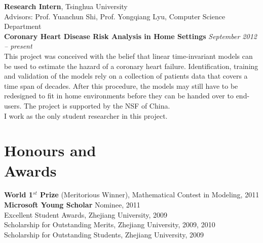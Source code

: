 \documentclass[margin,line]{resume}
\begin{document}
\begin{resume}
    \textbf{Research Intern}, Tsinghua University \\
    Advisors: Prof. Yuanchun Shi, Prof. Yongqiang Lyu, Computer Science Department \vspace{2mm}\\%
    \textbf{Coronary Heart Disease Risk Analysis in Home Settings} \hfill \textsl{September 2012 -- present}\\
    This project was conceived with the belief that linear time-invariant models can be used to estimate the hazard of a coronary heart failure. Identification, training and validation of the models rely on a collection of patients data that covers a time span of decades. After this procedure, the models may still have to be redesigned to fit in home environments before they can be handed over to end-users. The project is supported by the NSF of China. \\
    I work as the only student researcher in this project.\\
   
   \vspace{5cm}
   
    

    \section{\mysidestyle Honours and\\Awards} 

   \textbf{World 1$^{st}$ Prize} (Meritorious Winner), Mathematical Contest in Modeling, 2011 \\
   \textbf{Microsoft Young Scholar} Nominee, 2011\\
   Excellent Student Awards, Zhejiang University, 2009\\
   Scholarship for Outstanding Merits, Zhejiang University, 2009, 2010\\
   Scholarship for Outstanding Students, Zhejiang University, 2009


\end{resume}
\end{document}
